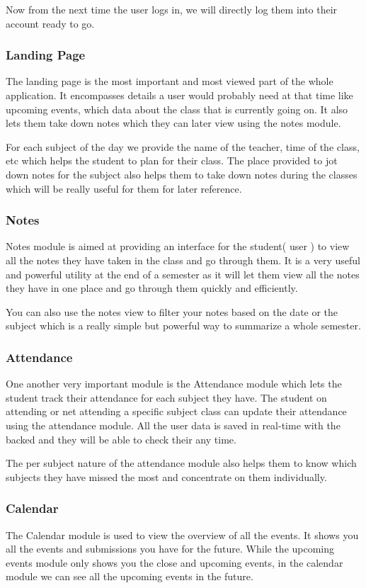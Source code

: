 \documentclass{article}
\begin{document}
Now from the next time the user logs in, we will directly log them into their account ready to go.

\subsubsection{Landing Page}
The landing page is the most important and most viewed part of the whole application. It encompasses details a user would probably need at that time like upcoming events, which data about the class that is currently going on. It also lets them take down notes which they can later view using the notes module.

For each subject of the day we provide the name of the teacher, time of the class, etc which helps the student to plan for their class.
The place provided to jot down notes for the subject also helps them to take down notes during the classes which will be really useful for them for later reference.

\subsubsection{Notes}
Notes module is aimed at providing an interface for the student( user ) to view all the notes they have taken in the class and go through them.
It is a very useful and powerful utility at the end of a semester as it will let them view all the notes they have in one place and go through them quickly and efficiently.

You can also use the notes view to filter your notes based on the date or the subject which is a really simple but powerful way to summarize a whole semester.

\subsubsection{Attendance}
One another very important module is the Attendance module which lets the student track their attendance for each subject they have. The student on attending or net attending a specific subject class can update their attendance using the attendance module. All the user data is saved in real-time with the backed and they will be able to check their any time.

The per subject nature of the attendance module also helps them to know which subjects they have missed the most and concentrate on them individually.

\subsubsection{Calendar}
The Calendar module is used to view the overview of all the events. It shows you all the events and submissions you have for the future. While the upcoming events module only shows you the close and upcoming events, in the calendar module we can see all the upcoming events in the future.
\end{document}
